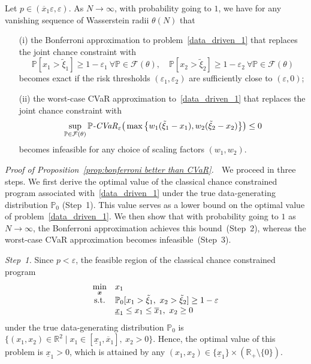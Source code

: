 \documentclass[nonblindrev]{informs2017}
\newcommand{\1}[1]{\mathds{1}{\left(#1\right)}}
\begin{document}
\begin{proposition}\label{prop:bonferroni better than CVaR}
	Let $p \in (\overline{x}_1 \varepsilon, \varepsilon)$. As $N \to \infty$, with probability going to $1$, we have for any vanishing sequence of Wasserstein radii $\theta(N)$ that
	\begin{enumerate}
		\item[(i)] the Bonferroni approximation to problem~\eqref{data_driven_1} that replaces the joint chance constraint with
		\begin{equation*}
			\mathbb{P} [x_1 > \tilde{\xi}_1] \geq 1-\varepsilon_1 ~\forall \mathbb{P} \in \mathcal{F}(\theta), \quad
			\mathbb{P} [x_2 > \tilde{\xi}_2] \geq 1-\varepsilon_2 ~\forall \mathbb{P} \in \mathcal{F}(\theta)
		\end{equation*}
		becomes exact if the risk thresholds $(\varepsilon_1, \varepsilon_2)$ are sufficiently close to $(\varepsilon, 0)$;
		\item[(ii)] the worst-case CVaR approximation to~\eqref{data_driven_1} that replaces the joint chance constraint with
		\begin{equation*}
			\sup_{\mathbb{P} \in \mathcal{F}(\theta)}\mathbb{P}\text{\emph{-CVaR}}_{\varepsilon}\big(\max\big\{w_1(\tilde{\xi}_1 - x_1), w_2(\tilde{\xi}_2 - x_2)\big\}\big) \leq 0
		\end{equation*}
		becomes infeasible for any choice of scaling factors $(w_1, w_2)$.
	\end{enumerate}
\end{proposition}

\noindent \emph{Proof of Proposition~\ref{prop:bonferroni better than CVaR}.} $\;$ 
We proceed in three steps. We first derive the optimal value of the classical chance constrained program associated with~\eqref{data_driven_1} under the true data-generating distribution $\mathbb{P}_0$ (Step~1). This value serves as a lower bound on the optimal value of problem~\eqref{data_driven_1}. We then show that with probability going to $1$ as $N \to \infty$, the Bonferroni approximation achieves this bound~(Step~2), whereas the worst-case CVaR approximation becomes infeasible~(Step~3).

{\em Step~1.} Since $p < \varepsilon$, the feasible region of the classical chance constrained program
\begin{equation*}
	\begin{array}{cl}
		\displaystyle \min_{\bm{x}} & x_1 \\
		{\rm s.t.} & \displaystyle \mathbb{P}_0 [x_1 > \tilde{\xi}_1, ~x_2 > \tilde{\xi}_2] \geq 1-\varepsilon \\
		& \underline{x}_1 \leq x_1 \leq \overline{x}_1, ~x_2 \geq 0
	\end{array}
\end{equation*}
under the true data-generating distribution $\mathbb{P}_0$ is $\{ (x_1, x_2) \in \mathbb{R}^2 \mid x_1 \in [\underline{x}_1, \overline{x}_1], ~x_2 > 0 \}$. Hence, the optimal value of this problem is $\underline{x}_1>0$, which is attained by any $(x_1, x_2) \in \{ \underline{x}_1 \} \times (\mathbb{R}_+ \setminus \{ 0 \})$.
\end{document}
